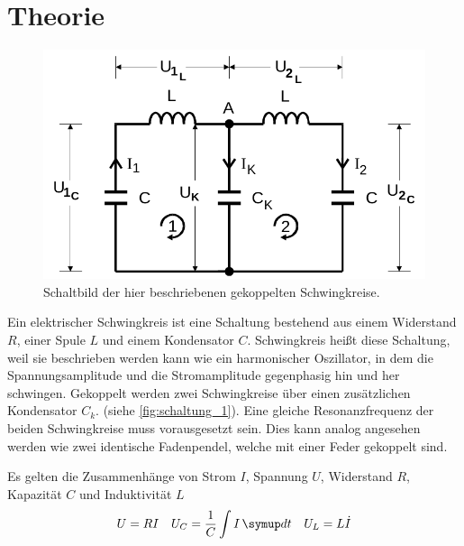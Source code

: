 \section{Theorie}
\label{sec:Theorie}




\begin{figure}
    \centering
    \includegraphics[width=\textwidth/2]{images/schaltung_1.png}
    \caption{Schaltbild der hier beschriebenen gekoppelten Schwingkreise. \cite{V355}}
    \label{fig:schaltung_1}
\end{figure}

Ein elektrischer Schwingkreis ist eine Schaltung bestehend aus einem Widerstand $R$, einer Spule $L$ und einem Kondensator $C$. 
Schwingkreis heißt diese Schaltung, weil sie beschrieben werden kann wie ein harmonischer Oszillator, in dem die Spannungsamplitude und die Stromamplitude gegenphasig hin und her schwingen.
Gekoppelt werden zwei Schwingkreise über einen zusätzlichen Kondensator $C_k$. (siehe \autoref{fig:schaltung_1}).
Eine gleiche Resonanzfrequenz der beiden Schwingkreise muss vorausgesetzt sein. 
Dies kann analog angesehen werden wie zwei identische Fadenpendel, welche mit einer Feder gekoppelt sind.

Es gelten die Zusammenhänge von Strom $I$, Spannung $U$, Widerstand $R$, Kapazität $C$ und Induktivität $L$
\begin{align}
    U = RI && U_C = \frac{1}{C} \int I \dif{t} && U_L = L \dot{I}
\end{align}

